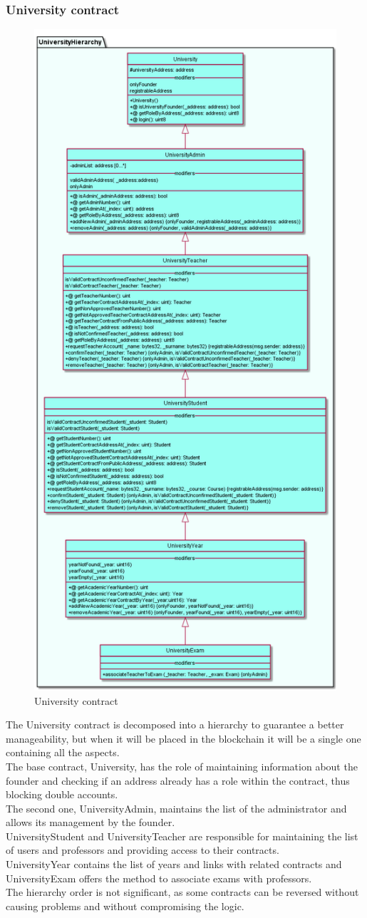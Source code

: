 \documentclass[ManualeSviluppatore]{subfiles}
\begin{document}
\subsubsection{University contract}
\begin{figure}[H]
	\centering
	\includegraphics[width=0.5\linewidth]{"diagrammi/solidity/university"}
	\caption{University contract}
	\label{fig:University contract}
\end{figure}
The University contract is decomposed into a hierarchy to guarantee a better manageability, but when it will be placed in the blockchain it will be a single one containing all the aspects. \\
The base contract, University, has the role of maintaining information about the founder and checking if an address already has a role within the contract, thus blocking double accounts. \\
The second one, UniversityAdmin, maintains the list of the administrator and allows its management by the founder. \\
UniversityStudent and UniversityTeacher are responsible for maintaining the list of users and professors and providing access to their contracts. \\
UniversityYear contains the list of years and links with related contracts and UniversityExam offers the method to associate exams with professors. \\
The hierarchy order is not significant, as some contracts can be reversed without causing problems and without compromising the logic. \\
\end{document}
